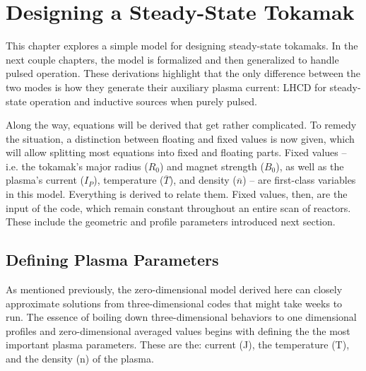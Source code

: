 %
%
%
%
%
%
%
%

\chapter{Designing a Steady-State Tokamak}

This chapter explores a simple model for designing steady-state tokamaks. In the next couple chapters, the model is formalized and then generalized to handle pulsed operation. These derivations highlight that the only difference between the two modes is how they generate their auxiliary plasma current: LHCD for steady-state operation and inductive sources when purely pulsed.

Along the way, equations will be derived that get rather complicated. To remedy the situation, a distinction between floating and fixed values is now given, which will allow splitting most equations into fixed and floating parts. Fixed values -- i.e. the tokamak's major radius ($R_0$) and magnet strength ($B_0$), as well as the plasma's current ($I_P$), temperature ($\overline T$), and density ($\overline n$) -- are first-class variables in this model. Everything is derived to relate them. Fixed values, then, are the input of the code, which remain constant throughout an entire scan of reactors.  These include the geometric and profile parameters introduced next section. 

\section{Defining Plasma Parameters}

As mentioned previously, the zero-dimensional model derived here can closely approximate solutions from three-dimensional codes that might take weeks to run. The essence of boiling down three-dimensional behaviors to one dimensional profiles and zero-dimensional averaged values begins with defining the the most important plasma parameters. These are the: current (J), the temperature (T), and the density (n) of the plasma.

